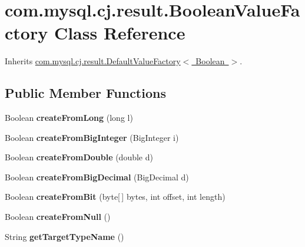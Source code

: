 \hypertarget{classcom_1_1mysql_1_1cj_1_1result_1_1_boolean_value_factory}{}\section{com.\+mysql.\+cj.\+result.\+Boolean\+Value\+Factory Class Reference}
\label{classcom_1_1mysql_1_1cj_1_1result_1_1_boolean_value_factory}


Inherits \mbox{\hyperlink{classcom_1_1mysql_1_1cj_1_1result_1_1_default_value_factory}{com.\+mysql.\+cj.\+result.\+Default\+Value\+Factory$<$ Boolean $>$}}.

\subsection*{Public Member Functions}
\begin{DoxyCompactItemize}
\item 
\mbox{\label{classcom_1_1mysql_1_1cj_1_1result_1_1_boolean_value_factory_ac742482e85b92ebd7c9dfb15018da704}} 
Boolean {\bfseries create\+From\+Long} (long l)
\item 
\mbox{\label{classcom_1_1mysql_1_1cj_1_1result_1_1_boolean_value_factory_a5be4993261599b62bdf667ef9195f67a}} 
Boolean {\bfseries create\+From\+Big\+Integer} (Big\+Integer i)
\item 
\mbox{\label{classcom_1_1mysql_1_1cj_1_1result_1_1_boolean_value_factory_a3f9de612b9f966cec999d7f860863d61}} 
Boolean {\bfseries create\+From\+Double} (double d)
\item 
\mbox{\label{classcom_1_1mysql_1_1cj_1_1result_1_1_boolean_value_factory_ab31d0d103b290ef094941ecb379657a5}} 
Boolean {\bfseries create\+From\+Big\+Decimal} (Big\+Decimal d)
\item 
\mbox{\label{classcom_1_1mysql_1_1cj_1_1result_1_1_boolean_value_factory_ab12565f0992a5b3c6d263ac8a043c5f6}} 
Boolean {\bfseries create\+From\+Bit} (byte\mbox{[}$\,$\mbox{]} bytes, int offset, int length)
\item 
\mbox{\label{classcom_1_1mysql_1_1cj_1_1result_1_1_boolean_value_factory_a15507d2d21b82d7e122aca762951e76c}} 
Boolean {\bfseries create\+From\+Null} ()
\item 
\mbox{\label{classcom_1_1mysql_1_1cj_1_1result_1_1_boolean_value_factory_a7c48686f9ebcc00e4b5adda9fb66e05e}} 
String {\bfseries get\+Target\+Type\+Name} ()
\end{DoxyCompactItemize}


